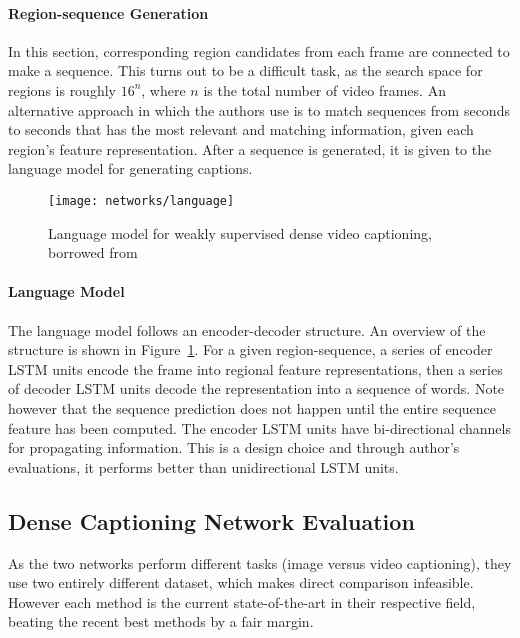 \documentclass[12pt,onecolumn,letterpaper,draftclsnofoot]{article}
\newcommand{\figref}[1]{Figure~\ref{fig:#1}}
\begin{document}
\paragraph{Region-sequence Generation}
In this section, corresponding region candidates from each frame are connected
to make a sequence. This turns out to be a difficult task, as the search space
for regions is roughly $16^n$, where $n$ is the total number of video frames.
An alternative approach in which the authors use is to match sequences from
seconds to seconds that has the most relevant and matching information, given
each region's feature representation. After a sequence is generated, it is
given to the language model for generating captions.

\begin{figure}
  \centering
  \texttt{[image: networks/language]}
  \caption{Language model for weakly supervised dense video captioning,
  borrowed from \cite{denseshen}}
  \label{fig:language}
\end{figure}

\paragraph{Language Model}
The language model follows an encoder-decoder structure. An overview of the
structure is shown in \figref{language}. For a given region-sequence, a series
of encoder LSTM units encode the frame into regional feature representations,
then a series of decoder LSTM units decode the representation into a sequence
of words. Note however that the sequence prediction does not happen until
the entire sequence feature has been computed. The encoder LSTM units have
bi-directional channels for propagating information. This is a design choice
and through author's evaluations, it performs better than unidirectional LSTM
units.

\subsection{Dense Captioning Network Evaluation}
As the two networks perform different tasks (image versus video captioning),
they use two entirely different dataset, which makes direct comparison
infeasible. However each method is the current state-of-the-art in their
respective field, beating the recent best methods by a fair margin.
\end{document}
